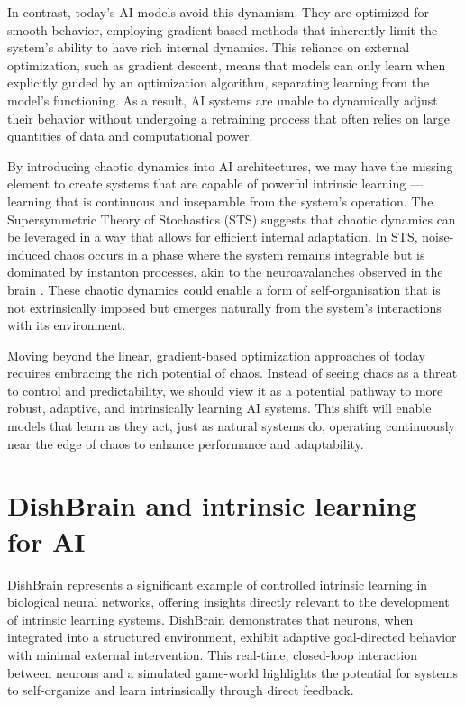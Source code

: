 \documentclass{article}
\begin{document}
In contrast, today's AI models avoid this dynamism. They are optimized
for smooth behavior, employing gradient-based methods that inherently
limit the system's ability to have rich internal dynamics.  This reliance
on external optimization, such as gradient descent, means that models
can only learn when explicitly guided by an optimization algorithm,
separating learning from the model's functioning. As a result, AI systems
are unable to dynamically adjust their behavior without undergoing a
retraining process that often relies on large quantities of data and
computational power.

By introducing chaotic dynamics into AI architectures, we may have the missing element to
create systems that are capable of powerful intrinsic learning --- learning
that is continuous and inseparable from the system's operation. The
Supersymmetric Theory of Stochastics (STS) suggests that chaotic
dynamics can be leveraged in a way that allows for efficient internal adaptation.
In STS, noise-induced chaos occurs in a phase where the system remains integrable but is dominated
by instanton processes, akin to the neuroavalanches observed in the
brain \cite{ovchinnikov2021}. These chaotic dynamics could enable a form of
self-organisation that is not extrinsically imposed but emerges naturally
from the system's interactions with its environment.

Moving beyond the linear, gradient-based optimization approaches of
today requires embracing the rich potential of chaos. Instead of seeing
chaos as a threat to control and predictability, we should view it as a
potential pathway to more robust, adaptive, and intrinsically learning
AI systems. This shift will enable models that learn as they act, just
as natural systems do, operating continuously near the edge of chaos to
enhance performance and adaptability.


\section{DishBrain and intrinsic learning for AI}

DishBrain \cite{Kagan2022} represents a significant example of
controlled intrinsic learning in biological neural networks, offering
insights directly relevant to the development of intrinsic learning
systems. DishBrain demonstrates that neurons, when integrated into a
structured environment, exhibit adaptive goal-directed behavior with
minimal external intervention. This real-time, closed-loop interaction
between neurons and a simulated game-world highlights the potential for
systems to self-organize and learn intrinsically through direct feedback.
\end{document}
